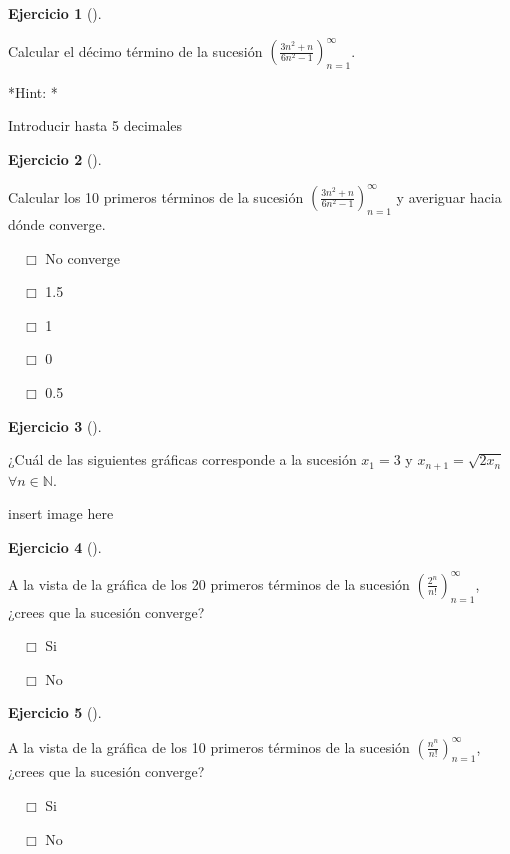 \documentclass[
  a4paper,
]{scrreport}
\theoremstyle{definition}
\newtheorem{exercise}{Ejercicio}[chapter]
\theoremstyle{remark}
\begin{document}
\leavevmode{}%
\begin{exercise}[]\label{exr-sucesiones-propuesto-1}

Calcular el décimo término de la sucesión
\(\left(\frac{3n^2+n}{6n^2-1}\right)_{n=1}^\infty\).

\vspace{18pt}*Hint: *

Introducir hasta 5 decimales

\end{exercise}

\leavevmode{}%
\begin{exercise}[]\label{exr-sucesiones-propuesto-2}

Calcular los 10 primeros términos de la sucesión
\(\left(\frac{3n^2+n}{6n^2-1}\right)_{n=1}^\infty\) y averiguar hacia
dónde converge.

${\quad\Box}$ No converge

${\quad\Box}$ 1.5

${\quad\Box}$ 1

${\quad\Box}$ 0

${\quad\Box}$ 0.5

\end{exercise}

\leavevmode{}%
\begin{exercise}[]\label{exr-sucesiones-propuesto-3}

¿Cuál de las siguientes gráficas corresponde a la sucesión \(x_1=3\) y
\(x_{n+1}=\sqrt{2x_n}\) \(\forall n\in\mathbb{N}\).

insert image here

\end{exercise}

\leavevmode{}%
\begin{exercise}[]\label{exr-sucesiones-propuesto-4}

A la vista de la gráfica de los 20 primeros términos de la sucesión
\(\left(\frac{2^n}{n!}\right)_{n=1}^\infty\), ¿crees que la sucesión
converge?

${\quad\Box}$ Si

${\quad\Box}$ No

\end{exercise}

\leavevmode{}%
\begin{exercise}[]\label{exr-sucesiones-propuesto-5}

A la vista de la gráfica de los 10 primeros términos de la sucesión
\(\left(\frac{n^n}{n!}\right)_{n=1}^\infty\), ¿crees que la sucesión
converge?

${\quad\Box}$ Si

${\quad\Box}$ No

\end{exercise}
\end{document}
